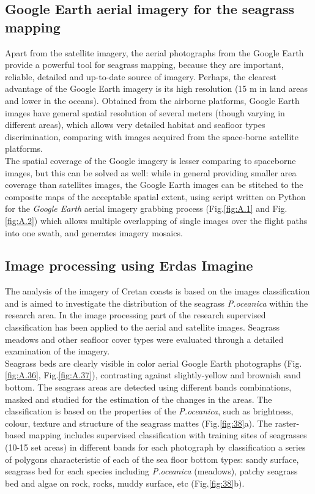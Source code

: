 \documentclass[11pt]{article}
\begin{document}
\subsection[Google Earth aerial imagery]{Google Earth aerial imagery for the seagrass mapping}
Apart from the satellite imagery, the aerial photographs from the Google Earth provide
a powerful tool for seagrass mapping, because they are important, reliable, detailed
and up-to-date source of imagery.
Perhaps, the clearest advantage of the Google Earth imagery is its high resolution (15 m in land areas and lower in the oceans).
Obtained from the airborne platforms, Google Earth images have general spatial
resolution of several meters (though varying in different areas), which allows very
detailed habitat and seafloor types discrimination, comparing with images
acquired from the space-borne satellite platforms.\\
The spatial coverage of the Google imagery is lesser comparing to spaceborne images, but this can be solved as
well: while in general providing smaller area coverage than satellites images, the Google Earth
images can be stitched to the composite maps of the acceptable spatial extent, using script written on Python for the \textit{Google Earth} aerial imagery grabbing process (Fig.\ref{fig:A.1} and Fig.\ref{fig:A.2})\label{gdal} which allows multiple overlapping of single images over the flight paths into one swath, and generates imagery mosaics.

\subsection{Image processing using Erdas Imagine}\label{page-47}
The analysis of the imagery of Cretan coasts is based on the images classification and is aimed to
investigate the distribution of the seagrass \textit{P.oceanica} within the research area.
In the image processing part of the research supervised classification has been applied to the aerial
and satellite images. Seagrass meadows and other seafloor cover types were evaluated through a
detailed examination of the imagery. \\
Seagrass beds are clearly visible in color aerial Google Earth
photographs (Fig.\ref{fig:A.36}, Fig.\ref{fig:A.37}), contrasting against slightly-yellow and brownish sand bottom. The seagrass areas are
detected using different bands combinations, masked and studied for the estimation of the changes in
the areas. The classification is based on the properties of the \textit{P.oceanica}, such as brightness,
colour, texture and structure of the seagrass mattes (Fig.\ref{fig:38}a). The raster-based mapping\label{page-48}
includes supervised classification with training sites of seagrasses (10-15 set areas) in different bands
for each photograph by classification a series of polygons characteristic of each of the sea floor
bottom types: sandy surface, seagrass bed for each species including \textit{P.oceanica} (meadows), patchy
seagrass bed and algae on rock, rocks, muddy surface, etc (Fig.\ref{fig:38}b).
\end{document}
